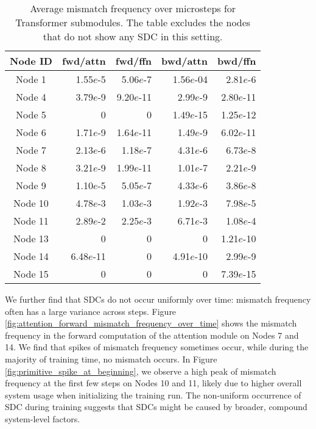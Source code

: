 \begin{table}[t]
\begin{center}
\begin{small}
\begin{sc}
\setlength{\tabcolsep}{3pt}
\renewcommand{\arraystretch}{1.1} 
\begin{tabular}{crrrr}
\toprule
Node ID & fwd/attn & fwd/ffn & bwd/attn & bwd/ffn  \\ \midrule
Node 1  & 1.55$e$-5  & 5.06$e$-7  & 1.56$e$-04  & 2.81$e$-6   \\
Node 4  & 3.79$e$-9  & 9.20$e$-11  & 2.99$e$-9  & 2.80$e$-11  \\
Node 5  & 0  & 0  & 1.49$e$-15  & 1.25$e$-12  \\
Node 6  & 1.71$e$-9  & 1.64$e$-11  & 1.49$e$-9  & 6.02$e$-11   \\
Node 7  & 2.13$e$-6  & 1.18$e$-7  & 4.31$e$-6  & 6.73$e$-8   \\
Node 8  & 3.21$e$-9  & 1.99$e$-11   & 1.01$e$-7  & 2.21$e$-9   \\
Node 9  & 1.10$e$-5  & 5.05$e$-7   & 4.33$e$-6  & 3.86$e$-8  \\
Node 10 & 4.78$e$-3  & 1.03$e$-3    & 1.92$e$-3  & 7.98$e$-5   \\
Node 11 & 2.89$e$-2  & 2.25$e$-3  & 6.71$e$-3  & 1.08$e$-4   \\
Node 13 & 0  & 0   & 0  & 1.21$e$-10  \\
Node 14 & 6.48$e$-11  & 0   & 4.91$e$-10  & 2.99$e$-9   \\
Node 15 & 0  & 0   & 0  & 7.39$e$-15  \\
\bottomrule
\end{tabular}
\end{sc}
\end{small}
\end{center}
\vskip -0.1in
\caption{Average mismatch frequency over microsteps for Transformer submodules. The table excludes the nodes that do not show any SDC in this setting.}
\vskip -0.1in
\label{fig:primitive_frequency_summarized}
\end{table}

We further find that SDCs do not occur uniformly over time: mismatch frequency often has a large variance across steps. Figure \ref{fig:attention_forward_mismatch_frequency_over_time} shows the mismatch frequency in the forward computation of the attention module on Nodes 7 and 14. We find that spikes of mismatch frequency sometimes occur, while during the majority of training time, no mismatch occurs. In Figure \ref{fig:primitive_spike_at_beginning}, we observe a high peak of mismatch frequency at the first few steps on Nodes 10 and 11, likely due to higher overall system usage when initializing the training run. The non-uniform occurrence of SDC during training suggests that SDCs might be caused by broader, compound system-level factors.

